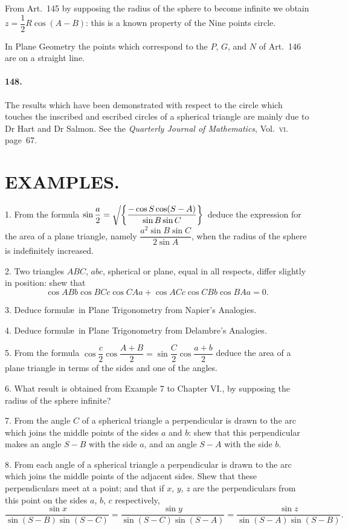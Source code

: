\documentclass{book}[2004/02/16]
\newcommand{\Surd}[1]{\left\delimiter"4270370 #1\right.}
\begin{document}
\begin{mainmatter}
\begin{spacing}{1.3}
From Art.\ 145 by supposing the radius of the sphere to become
infinite we obtain $z = \dfrac12 R \cos(A - B)$: this is a known
property of the Nine points circle.

In Plane Geometry the points which correspond to the $P$, $G$,
and $N$ of Art.\ 146 are on a straight line.

\paragraph{148.} The results which have been demonstrated with respect
to the circle which touches the inscribed and escribed circles of a
spherical triangle are mainly due to Dr Hart and Dr Salmon.
See the \textit{Quarterly Journal of Mathematics}, Vol.~\textsc{vi}. page~67.

\section*{\centering\normalsize EXAMPLES.}

1. From the formula $\sin\dfrac{a}{2}=\Surd{\left\{\dfrac{-\cos S\cos(S-A)}{\sin B\sin C}\right\}}$ deduce the expression for the area of a plane triangle, namely
$\dfrac{a^2\sin B\sin C}{2\sin A}$, when the radius of the sphere is indefinitely increased.
\medskip

2. Two triangles $ABC$, $abc$, spherical or plane, equal in all
respects, differ slightly in position: shew that
\[
\cos ABb\cos BCc\cos CAa+\cos ACc\cos CBb\cos BAa=0.
\]

3. Deduce formul\ae\ in Plane Trigonometry from Napier's
Analogies.
\medskip

4. Deduce formul\ae\ in Plane Trigonometry from Delambre's
Analogies.
\medskip

5. From the formula
$\cos\dfrac{c}{2}\cos\dfrac{A+B}{2}
=\sin\dfrac{C}{2}\cos\dfrac{a+b}{2}$ deduce
the area of a plane triangle in terms of the sides and one of the
angles.
\medskip

6. What result is obtained from Example 7 to Chapter VI.,
by supposing the radius of the sphere infinite?
\medskip

7. From the angle $C$ of a spherical triangle a perpendicular is
drawn to the arc which joins the middle points of the sides $a$ and
$b$: shew that this perpendicular makes an angle $S-B$ with the
side $a$, and an angle $S-A$ with the side $b$.
\medskip

8. From each angle of a spherical triangle a perpendicular is
drawn to the arc which joins the middle points of the adjacent
sides. Shew that these perpendiculars meet at a point; and that
if $x$, $y$, $z$ are the perpendiculars from this point on the sides $a$, $b$, $c$
respectively,
\[
  \frac{\sin x}{\sin(S-B)\sin(S-C)}
= \frac{\sin y}{\sin(S-C)\sin(S-A)}
= \frac{\sin z}{\sin(S-A)\sin(S-B)}.
\]


\end{spacing}
\end{mainmatter}
\end{document}
